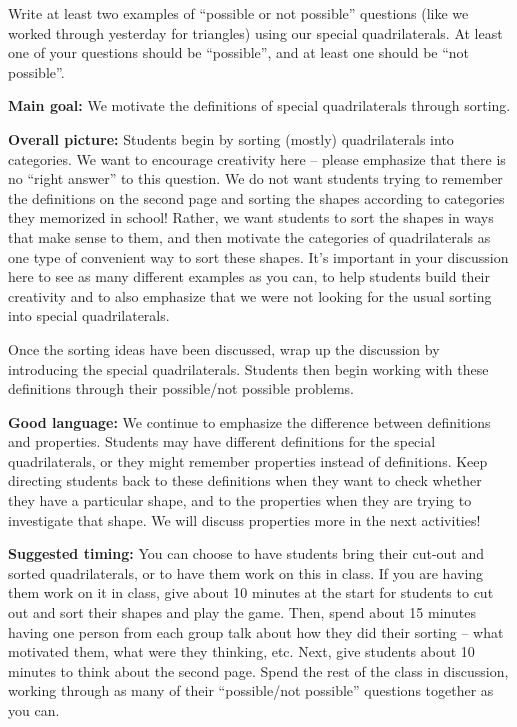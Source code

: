 \documentclass[nooutcomes,noauthor]{ximera}
\begin{document}
\begin{problem}
Write at least two examples of ``possible or not possible'' questions (like we worked through yesterday for triangles) using our special quadrilaterals.  At least one of your questions should be ``possible'', and at least one should be ``not possible''. 
\end{problem}

\pagebreak
\begin{instructorNotes}

{\bf Main goal:} We motivate the definitions of special quadrilaterals through sorting.



{\bf Overall picture:}
Students begin by sorting (mostly) quadrilaterals into categories. We want to encourage creativity here -- please emphasize that there is no ``right answer'' to this question. We do not want students trying to remember the definitions on the second page and sorting the shapes according to categories they memorized in school! Rather, we want students to sort the shapes in ways that make sense to them, and then motivate the categories of quadrilaterals as one type of convenient way to sort these shapes. It's important in your discussion here to see as many different examples as you can, to help students build their creativity and to also emphasize that we were not looking for the usual sorting into special quadrilaterals.

Once the sorting ideas have been discussed, wrap up the discussion by introducing the special quadrilaterals. Students then begin working with these definitions through their possible/not possible problems.


{\bf Good language:} We continue to emphasize the difference between definitions and properties. Students may have different definitions for the special quadrilaterals, or they might remember properties instead of definitions. Keep directing students back to these definitions when they want to check whether they have a particular shape, and to the properties when they are trying to investigate that shape. We will discuss properties more in the next activities!


{\bf Suggested timing:} You can choose to have students bring their cut-out and sorted quadrilaterals, or to have them work on this in class. If you are having them work on it in class, give about 10 minutes at the start for students to cut out and sort their shapes and play the game. Then, spend about 15 minutes having one person from each group talk about how they did their sorting -- what motivated them, what were they thinking, etc. Next, give students about 10 minutes to think about the second page. Spend the rest of the class in discussion, working through as many of their ``possible/not possible'' questions together as you can.



\end{instructorNotes}
\end{document}
